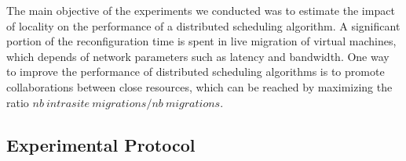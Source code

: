
%
%
%




The main objective of the experiments we conducted was to estimate the impact of locality on
the performance of a distributed scheduling algorithm. A significant portion of the
reconfiguration time is spent in live migration of virtual machines, which depends of
network parameters such as latency and bandwidth. One way to improve the performance of
distributed scheduling algorithms is to promote collaborations between close resources,
which can be reached by maximizing the ratio $nb\ intrasite\ migrations/nb\ migrations$.


\subsection{Experimental Protocol}

